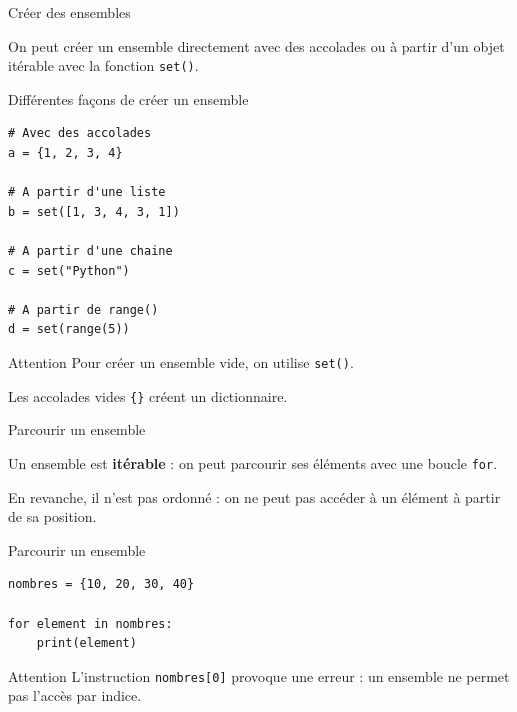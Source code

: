 \documentclass[10pt]{beamer}
\begin{document}
\begin{frame}[fragile]{Créer des ensembles}

On peut créer un ensemble directement avec des accolades
ou à partir d'un objet itérable avec la fonction \texttt{set()}.

\begin{exampleblock}{Différentes façons de créer un ensemble}
\small
\begin{lstlisting}
# Avec des accolades
a = {1, 2, 3, 4}

# A partir d'une liste
b = set([1, 3, 4, 3, 1])

# A partir d'une chaine
c = set("Python")

# A partir de range()
d = set(range(5))
\end{lstlisting}
\end{exampleblock}

\begin{block}{Attention}
\small
Pour créer un ensemble vide, on utilise \texttt{set()}.

Les accolades vides \texttt{\{\}} créent un dictionnaire.
\end{block}

\end{frame}
\begin{frame}[fragile]{Parcourir un ensemble}

Un ensemble est \textbf{itérable} : on peut parcourir ses
éléments avec une boucle \texttt{for}.

En revanche, il n'est pas ordonné : on ne peut pas accéder
à un élément à partir de sa position.

\begin{exampleblock}{Parcourir un ensemble}
\small
\begin{lstlisting}
nombres = {10, 20, 30, 40}

for element in nombres:
    print(element)
\end{lstlisting}
\end{exampleblock}

\begin{alertblock}{Attention}
\small
L'instruction \texttt{nombres[0]} provoque une erreur :
un ensemble ne permet pas l'accès par indice.
\end{alertblock}

\end{frame}
\end{document}

